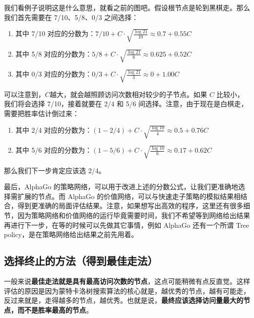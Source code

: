 \documentclass[12pt]{article}
\begin{document}
我们看例子说明这是什么意思，就看之前的图吧。假设根节点是轮到黑棋走。那么我们首先需要在 7/10、5/8、0/3 之间选择：
\begin{enumerate}
\setlength{\itemsep}{0pt}
\setlength{\parsep}{0pt}
\setlength{\parskip}{0pt}
    \item 其中 7/10 对应的分数为：$7/10 + C\cdot\sqrt{\frac{\log{21}}{10}} \approx 0.7 + 0.55C$
    \item 其中 5/8 对应的分数为：$5/8 + C\cdot\sqrt{\frac{\log{21}}{8}} \approx 0.625 + 0.52C$
    \item 其中 0/3 对应的分数为：$0/3 + C\cdot\sqrt{\frac{\log{21}}{3}} \approx 0 + 1.00C$ 
\end{enumerate}
可以注意到，$C$越大，就会越照顾访问次数相对较少的子节点。如果 $C$ 比较小，我们将会选择 7/10，接着就要在 2/4 和 5/6 间选择。注意，由于现在是白棋走，需要把胜率估计倒过来：
\begin{enumerate}
\setlength{\itemsep}{0pt}
\setlength{\parsep}{0pt}
\setlength{\parskip}{0pt}
    \item 其中 2/4 对应的分数为：$(1-2/4) + C\cdot\sqrt{\frac{\log{10}}{4}} \approx 0.5+0.76C$
    \item 其中 5/6 对应的分数为：$(1-5/6) + C\cdot\sqrt{\frac{\log{10}}{6}} \approx 0.17+0.62C$
\end{enumerate}

那么我们下一步肯定应该选 2/4。

最后，AlphaGo 的策略网络，可以用于改进上述的分数公式，让我们更准确地选择需扩展的节点。而 AlphaGo 的价值网络，可以与快速走子策略的模拟结果相结合，得到更准确的局面评估结果。注意，如果想写出高效的程序，这里还有很多细节，因为策略网络和价值网络的运行毕竟需要时间，我们不希望等到网络给出结果再进行下一步，在等的时候可以先做其它事情，例如 AlphaGo 还有一个所谓 Tree policy，是在策略网络给出结果之前先用着。


\subsection{选择终止的方法（得到最佳走法）}
一般来说\textbf{最佳走法就是具有最高访问次数的节点}，这点可能稍微有点反直觉。这样评估的原因是因为蒙特卡洛树搜索算法的核心就是，越优秀的节点，越有可能走，反过来就是，走得越多的节点，越优秀。也就是说，\textbf{最终应该选择访问量最大的节点，而不是胜率最高的节点}。
\end{document}
